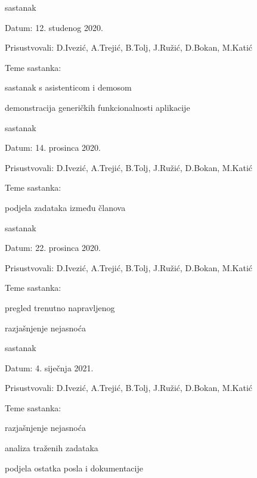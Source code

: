 \begin{packed_enum}
			
			\item  sastanak
			\item[] \begin{packed_item}
				\item Datum: 12. studenog 2020.
				\item Prisustvovali: D.Ivezić, A.Trejić, B.Tolj, J.Ružić, D.Bokan, M.Katić
				\item Teme sastanka:
				\begin{packed_item}
					\item  sastanak s asistenticom i demosom
					\item  demonstracija generičkih funkcionalnosti aplikacije
				\end{packed_item}
			\end{packed_item}
			
			\item  sastanak
			\item[] \begin{packed_item}
				\item Datum: 14. prosinca 2020.
				\item Prisustvovali: D.Ivezić, A.Trejić, B.Tolj, J.Ružić, D.Bokan, M.Katić
				\item Teme sastanka:
				\begin{packed_item}
					\item  podjela zadataka između članova
				\end{packed_item}
			\end{packed_item}
			
			\item  sastanak
			\item[] \begin{packed_item}
				\item Datum: 22. prosinca 2020.
				\item Prisustvovali: D.Ivezić, A.Trejić, B.Tolj, J.Ružić, D.Bokan, M.Katić
				\item Teme sastanka:
				\begin{packed_item}
					\item  pregled trenutno napravljenog
					\item  razjašnjenje nejasnoća
				\end{packed_item}
			\end{packed_item}
			
			\item  sastanak
			\item[] \begin{packed_item}
				\item Datum: 4. siječnja 2021.
				\item Prisustvovali: D.Ivezić, A.Trejić, B.Tolj, J.Ružić, D.Bokan, M.Katić
				\item Teme sastanka:
				\begin{packed_item}
					\item  razjašnjenje nejasnoća
					\item  analiza traženih zadataka
					\item  podjela ostatka posla i dokumentacije
				\end{packed_item}
			\end{packed_item}
			

\end{packed_enum}
